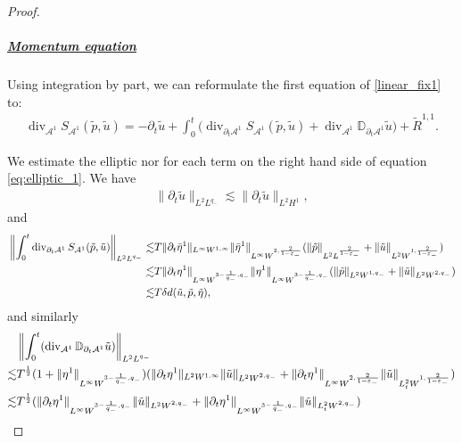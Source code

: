 \documentclass[letterpaper,reqno,10pt,twoside]{amsart}
\theoremstyle{definition}
\theoremstyle{remark}
\def\p{\partial}
\def\no{\nonumber}
\begin{document}
\begin{proof}
			\subparagraph{\underline{Momentum equation}}
			
			Using integration by part, we can reformulate the first equation of \eqref{linear_fix1} to:
			\begin{align}
				\operatorname{div}_{\mathcal{A}^{1}}S_{\mathcal{A}^{1}}(\tilde{p},\tilde{u})=-\p_{t}\tilde{u}+\int_{0}^{t}\Big(\operatorname{div}_{\p_{t}\mathcal{A}^{1}}S_{\mathcal{A}^{1}}(\tilde{p},\tilde{u})+\operatorname{div}_{\mathcal{A}^{1}}\mathbb{D}_{\p_{t}\mathcal{A}^{1}}\tilde{u} \Big)+\tilde{R}^{1,1}. \label{eq:elliptic_1}
			\end{align}
			
			\noindent We estimate the elliptic nor for each term on the right hand side of equation \eqref{eq:elliptic_1}. We have
			\begin{align}
				\|\p_{t}\tilde{u}\|_{L^{2}L^{q_{-}}}\lesssim \|\p_{t}\tilde{u}\|_{L^{2}H^{1}},
			\end{align}
			\noindent and
			\begin{align}{\label{eq:int_e_1}}
				\left\|\int_{0}^{t}\operatorname{div}_{\p_{t}\mathcal{A}^{1}}S_{\mathcal{A}^{1}}(\tilde{p},\tilde{u}) \right\|_{L^{2}L^{q_{-}}}\lesssim& T\|\p_{t}\bar{\eta}^{1}\|_{L^{\infty}W^{1,\infty}}\|\bar{\eta}^{1}\|_{L^{\infty}W^{2,\frac{2}{1-\varepsilon_{-}}}}(\|\tilde{p}\|_{L^{2}L^{\frac{2}{1-\varepsilon_{-}}}}+\|\tilde{u}\|_{L^{2}W^{1,\frac{2}{1-\varepsilon_{-}}}})\no\\
				\lesssim&T\|\p_{t}{\eta}^{1}\|_{L^{\infty}W^{3-\frac{1}{q_{-}},q_{-}}}\|{\eta}^{1}\|_{L^{\infty}W^{3-\frac{1}{q_{-}},q_{-}}}(\|\tilde{p}\|_{L^{2}W^{1,q_{-}}}+\|\tilde{u}\|_{L^{2}W^{2,q_{-}}})\no\\
				\lesssim& T\delta d(\tilde{u},\tilde{p},\tilde{\eta}),
			\end{align}
			\noindent and similarly
			\begin{align}{\label{eq:int_e_2}}
				&\left \|\int_{0}^{t}(\operatorname{div}_{\mathcal{A}^{1}}\mathbb{D}_{\p_{t}\mathcal{A}^{1}}\tilde{u}) \right\|_{L^{2}L^{q_{-}}}\no\\
				\lesssim&T^{\frac{1}{2}}(1+\|{\eta}^{1}\|_{L^{\infty}W^{3-\frac{1}{q_{-}},q_{-}}})(\|\p_{t}{\eta}^{1}\|_{L^{2}W^{1,\infty}}\|\tilde{u}\|_{L^{2}W^{2,q_{-}}}+\|\p_{t}\eta^{1}\|_{L^{\infty}W^{2,\frac{2}{1-\varepsilon_{-}}}}\|\tilde{u}\|_{L_{t}^{2}W^{1,\frac{2}{1-\varepsilon_{-}}}})\no\\
				\lesssim& T^{\frac{1}{2}}(\|\p_{t}{\eta}^{1}\|_{L^{\infty}W^{3-\frac{1}{q_{-}},q_{-}}}\|\tilde{u}\|_{L^{2}W^{2,q_{-}}}+\|\p_{t}\eta^{1}\|_{L^{\infty}W^{3-\frac{1}{q_{-}},q_{-}}}\|\tilde{u}\|_{L_{t}^{2}W^{2,q_{-}}})\no\\

\end{align}
\end{proof}
\end{document}
